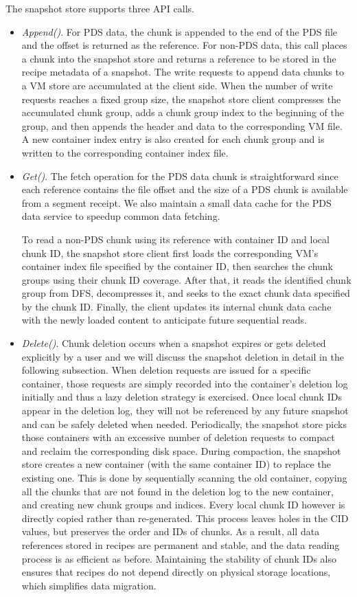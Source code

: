 The snapshot  store supports three API calls.
\begin{itemize}
\item {\em Append()}. 
For PDS data, the chunk is appended to the end of the PDS file and the offset is returned as the  reference.
For non-PDS data, this call places a chunk into 
the snapshot store and returns a reference to be stored in 
the recipe metadata of a snapshot. 
The write requests to append data chunks to a VM store are accumulated at the client side. 
When the number of write requests reaches a fixed group size, the snapshot store client compresses
the accumulated   chunk group, adds a chunk group index  to the beginning of the group, and then
appends the header and data  to the corresponding VM file.
A new container  index entry is also created for each chunk group and is written to the corresponding
container index file.

\item{\em Get()}.
The fetch operation for the PDS data chunk is straightforward since each reference contains 
the file offset and the size of a PDS chunk is available from a segment receipt.
We also maintain a small data cache for the PDS data service to speedup common data fetching.

To read a non-PDS chunk using its reference with container ID and local chunk ID,  the snapshot store client first loads the
corresponding VM's container index file specified by the container ID, then searches the chunk
groups  using their  chunk ID coverage.
After that, it reads the identified chunk group from DFS, decompresses it, and seeks to the exact chunk data 
specified by the chunk ID. 
Finally, the client updates its internal chunk data cache with the newly loaded content to 
anticipate future sequential reads.
\item {\em Delete()}.
Chunk deletion occurs when a snapshot expires or gets deleted explicitly by a user
and we will discuss the snapshot deletion in detail in the following subsection.
When deletion requests are issued for a specific container,
those requests are simply recorded into the  container's deletion log initially and thus  a lazy
deletion strategy is exercised.
Once local chunk IDs appear in
the deletion log, they will not be referenced by any future snapshot and can be safely deleted when needed. 
Periodically, the snapshot  store picks those containers with an excessive
number of deletion requests to  compact and  reclaim the corresponding disk space. 
During compaction, the snapshot store creates a new container (with the same container ID) to replace the 
existing one. This is done by sequentially scanning the old container, copying all the chunks that are not 
found in the deletion log to the new container, and creating new chunk groups and indices. 
Every local chunk ID however is directly copied rather than re-generated. This
process leaves holes in the CID values, but preserves the order and IDs of chunks.
As a result, all data references stored 
in recipes are permanent and stable, and the data reading process
is as efficient as before. Maintaining the stability of chunk IDs also ensures that recipes do not
depend directly on physical storage locations, which simplifies data migration.
\end{itemize}


